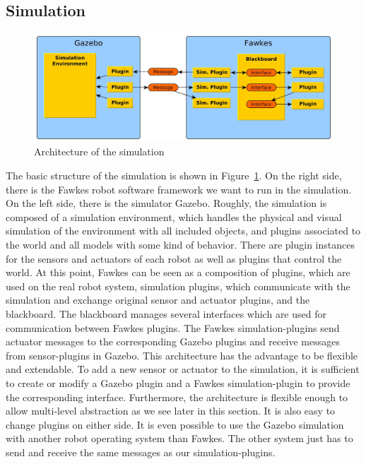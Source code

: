 \subsection{Simulation}
\label{sec:architecture_simulation}
\begin{figure}
\includegraphics[width=\textwidth]{tabs/fawkes_gazebo}
\caption{Architecture of the simulation}
\label{fig:fawkes_gazebo}
\end{figure}
The basic structure of the simulation is shown in Figure~\ref{fig:fawkes_gazebo}. On the right side, there is the Fawkes robot software framework we want to run in the simulation. On the left side, there is the simulator Gazebo. Roughly, the simulation is composed of a simulation environment, which handles the physical and visual simulation of the environment with all included objects, and plugins associated to the world and all models with some kind of behavior. There are plugin instances for the sensors and actuators of each robot as well as plugins that control the world. At this point, Fawkes can be seen as a composition of plugins, which are used on the real robot system, simulation plugins, which communicate with the simulation and exchange original sensor and actuator plugins, and the blackboard. The blackboard manages several interfaces which are used for communication between Fawkes plugins. The Fawkes simulation-plugins send actuator messages to the corresponding Gazebo plugins and receive messages from sensor-plugins in Gazebo. This architecture has the advantage to be flexible and extendable. To add a new sensor or actuator to the simulation, it is sufficient to create or modify a Gazebo plugin and a Fawkes simulation-plugin to provide the corresponding interface. Furthermore, the architecture is flexible enough to allow multi-level abstraction as we see later in this section. It is also easy to change plugins on either side. It is even possible to use the Gazebo simulation with another robot operating system than Fawkes. The other system just has to send and receive the same messages as our simulation-plugins.


